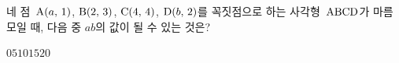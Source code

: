네 점~$\mathrm{A}(a,\,1)$, $\mathrm{B}(2,\,3)$, $\mathrm{C}(4,\,4)$, $\mathrm{D}(b,\,2)$를 꼭짓점으로 하는 사각형~$\mathrm{ABCD}$가 마름모일 때, 다음 중 $ab$의 값이 될 수 있는 것은?
\begin{choices32}{$0$}{$5$}{$10$}{$15$}{$20$}\end{choices32}
